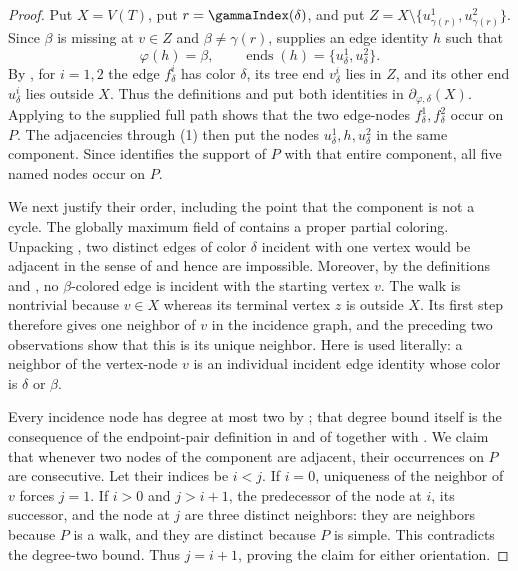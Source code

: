 \begin{proof}
Put $X=V(T)$, put $r=\gammaIndex(\delta)$, and put
$Z=X\setminus\{u^1_{\gamma(r)},u^2_{\gamma(r)}\}$.  Since $\beta$ is
missing at $v\in Z$ and $\beta\ne\gamma(r)$,
 supplies an edge identity
$h$ such that
\[
 \varphi(h)=\beta,
 \qquad \operatorname{ends}(h)=
       \{u^1_\delta,u^2_\delta\}.                         \tag{1}
\]
By , for $i=1,2$ the edge
$f^i_\delta$ has color $\delta$, its tree end $v^i_\delta$ lies in
$Z$, and its other end $u^i_\delta$ lies outside $X$.  Thus the
definitions  and 
put both identities in $\partial_{\varphi,\delta}(X)$.  Applying
 to the supplied full path
shows that the two edge-nodes $f^1_\delta,f^2_\delta$ occur on $P$.
The adjacencies through (1) then put the nodes
$u^1_\delta,h,u^2_\delta$ in the same component.  Since
 identifies the support of $P$ with
that entire component, all five named nodes occur on $P$.

We next justify their order, including the point that the component is
not a cycle.  The globally maximum field of
 contains a proper partial coloring.
Unpacking , two distinct edges of color
$\delta$ incident with one vertex would be adjacent in the sense of
 and hence are impossible.  Moreover, by the
definitions  and , no
$\beta$-colored edge is incident with the starting vertex $v$.  The walk
is nontrivial because $v\in X$ whereas its terminal vertex $z$ is outside
$X$.  Its first step therefore gives one neighbor of $v$ in the incidence
graph, and the preceding two observations show that this is its unique
neighbor.  Here  is used literally: a
neighbor of the vertex-node $v$ is an individual incident edge identity
whose color is $\delta$ or $\beta$.

Every incidence node has degree at most two by
; that degree bound itself is
the consequence of the endpoint-pair definition in
 and of
 together with
.  We claim that whenever two nodes of the
component are adjacent, their occurrences on $P$ are consecutive.  Let
their indices be $i<j$.  If $i=0$, uniqueness of the neighbor of $v$
forces $j=1$.  If $i>0$ and $j>i+1$, the predecessor of the node at $i$,
its successor, and the node at $j$ are three distinct neighbors: they are
neighbors because $P$ is a walk, and they are distinct because $P$ is
simple.  This contradicts the degree-two bound.  Thus $j=i+1$, proving
the claim for either orientation.


\end{proof}
